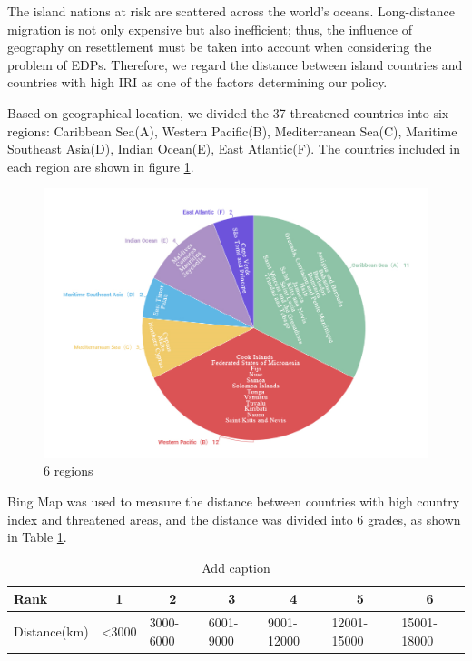 \documentclass[12pt]{article}  %
\begin{document}
The island nations at risk are scattered across the world's oceans. Long-distance migration is not only expensive but also inefficient; thus, the influence of geography on resettlement must be taken into account when considering the problem of EDPs. Therefore, we regard the distance between island countries and countries with high IRI as one of the factors determining our policy.



Based on geographical location, we divided the 37 threatened countries into six regions: Caribbean Sea(A), Western Pacific(B), Mediterranean Sea(C), Maritime Southeast Asia(D), Indian Ocean(E), East Atlantic(F). The countries included in each region are shown in figure \ref{6_regions}.


\begin{figure}[htbp]
	\centering
	\includegraphics[width=.8\textwidth]{6_regions.png}
	\caption{ 6 regions}\label{6_regions}
\end{figure}




Bing Map was used to measure the distance between countries with high country index and threatened areas, and the distance was divided into 6 grades, as shown in Table \ref{distance_level}.



\begin{table}[htbp]
  \centering
  \caption{Add caption}
    \begin{tabular}{lllllll}
    \toprule
    Rank  & \multicolumn{1}{c}{1} & \multicolumn{1}{c}{2} & \multicolumn{1}{c}{3} & \multicolumn{1}{c}{4} & \multicolumn{1}{c}{5} & \multicolumn{1}{c}{6} \\
    \midrule
    Distance(km) & <3000 & 3000-6000 & 6001-9000 & 9001-12000 & 12001-15000 & 15001-18000 \\
    \bottomrule
    \end{tabular}%
  \label{distance_level}%
\end{table}%
\end{document}
